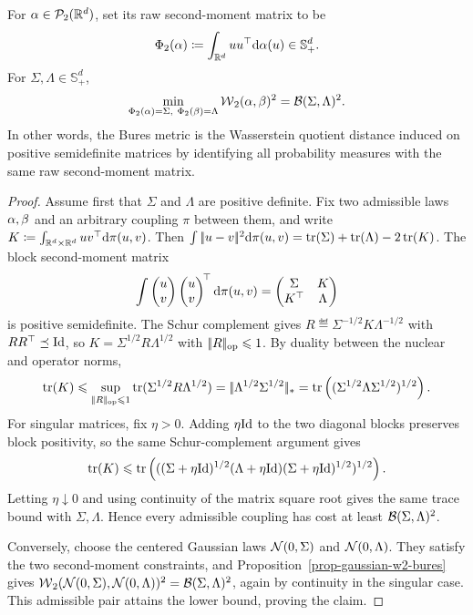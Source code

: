 \begin{prop}\label{prop-bures-second-moment-lift}
	For $\alpha\in\mathcal{P}_2(\mathbb{R}^d)$, set its raw second-moment matrix to be
	\[
		\Phi_2(\alpha)\coloneqq \int_{\mathbb{R}^d} uu^\top \mathrm{d}\alpha(u)\in\mathbb S_+^d.
	\]
	For $\Sigma,\Lambda\in\mathbb S_+^d$,
	\[
		\min_{\Phi_2(\al)=\Sigma,\ \Phi_2(\be)=\Lambda}
		\Wass_2(\al,\be)^2
		=
		\Bb(\Sigma,\Lambda)^2.
	\]
	In other words, the Bures metric is the Wasserstein quotient distance induced on positive semidefinite matrices by identifying all probability measures with the same raw second-moment matrix.
\end{prop}
\begin{proof}
	Assume first that $\Sigma$ and $\Lambda$ are positive definite. Fix two admissible laws $\alpha,\beta$ and an arbitrary coupling $\pi$ between them, and write
	$K\coloneqq\int_{\mathbb{R}^d\times\mathbb{R}^d}uv^\top\mathrm{d}\pi(u,v)$. Then
	$\int|\!| u-v |\!|^2\mathrm{d}\pi(u,v)
	=\operatorname{tr}(\Sigma)+\operatorname{tr}(\Lambda)-2\operatorname{tr}(K)$.
	The block second-moment matrix
	\[
		\int
		\begin{pmatrix}u\\ v\end{pmatrix}
		\begin{pmatrix}u\\ v\end{pmatrix}^{\!\top}
		\mathrm{d}\pi(u,v)
		=
		\begin{pmatrix}
			\Sigma & K\\
			K^\top & \Lambda
		\end{pmatrix}
	\]
	is positive semidefinite. The Schur complement gives
	$R\eqdef\Sigma^{-1/2}K\Lambda^{-1/2}$ with $RR^\top\preceq\mathrm{Id}$, so
	$K=\Sigma^{1/2}R\Lambda^{1/2}$ with $|\!| R |\!|_{\mathrm{op}}\leqslant1$. By duality between the nuclear and operator norms,
	\[
		\operatorname{tr}(K)
		\leqslant
		\sup_{|\!| R |\!|_{\mathrm{op}}\leqslant1}\operatorname{tr}(\Sigma^{1/2}R\Lambda^{1/2})
		=
		|\!| \Lambda^{1/2}\Sigma^{1/2} |\!|_*
		=
		\operatorname{tr}\left( (\Sigma^{1/2}\Lambda\Sigma^{1/2})^{1/2} \right).
	\]
	For singular matrices, fix $\eta>0$. Adding $\eta\mathrm{Id}$ to the two diagonal blocks preserves block positivity, so the same Schur-complement argument gives
	\[
		\operatorname{tr}(K)
		\leqslant
		\operatorname{tr}\left( ((\Sigma+\eta\mathrm{Id})^{1/2}(\Lambda+\eta\mathrm{Id})(\Sigma+\eta\mathrm{Id})^{1/2})^{1/2} \right).
	\]
	Letting $\eta\downarrow0$ and using continuity of the matrix square root gives the same trace bound with $\Sigma,\Lambda$. Hence every admissible coupling has cost at least $\mathcal{B}(\Sigma,\Lambda)^2$.

	Conversely, choose the centered Gaussian laws $\mathcal{N}(0,\Sigma)$ and $\mathcal{N}(0,\Lambda)$. They satisfy the two second-moment constraints, and Proposition~\ref{prop-gaussian-w2-bures} gives
	$\operatorname{\mathcal{W}}_2(\mathcal{N}(0,\Sigma),\mathcal{N}(0,\Lambda))^2
	=\mathcal{B}(\Sigma,\Lambda)^2$, again by continuity in the singular case. This admissible pair attains the lower bound, proving the claim.
\end{proof}

